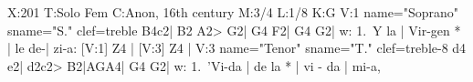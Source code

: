 X:201
T:Solo Fem
C:Anon, 16th century
M:3/4
L:1/8
K:G
V:1 name="Soprano" sname="S." clef=treble
B4c2| B2 A2> G2| G4 F2| G4 G2| 
w: 1.~Y la | Vir-gen * | le de-| zi-a:
[V:1] Z4 |
[V:3] Z4 |
V:3 name="Tenor" sname="T." clef=treble-8
d4 e2| d2c2> B2|AGA4| G4 G2|
w: 1.~'Vi-da | de la * | vi - da | mi-a,
